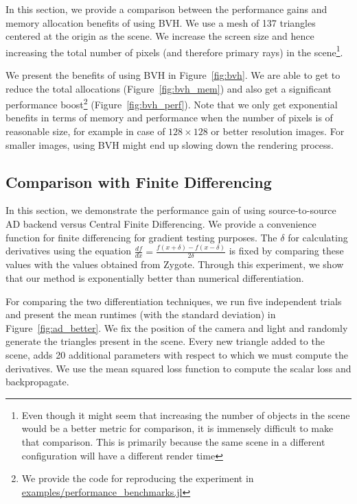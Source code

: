 \documentclass{juliacon}
\begin{document}
In this section, we provide a comparison between the performance gains and memory allocation benefits of using BVH. We use a mesh of 137 triangles centered at the origin as the scene. We increase the screen size and hence increasing the total number of pixels (and therefore primary rays) in the scene\footnote{Even though it might seem that increasing the number of objects in the scene would be a better metric for comparison, it is immensely difficult to make that comparison. This is primarily because the same scene in a different configuration will have a different render time}.

We present the benefits of using BVH in Figure~\ref{fig:bvh}. We are able to get to reduce the total allocations (Figure~\ref{fig:bvh_mem}) and also get a significant performance boost\footnote{\raggedright{We provide the code for reproducing the experiment in \href{https://zenodo.org/record/1442781}{examples/performance\_benchmarks.jl}}} (Figure~\ref{fig:bvh_perf}). Note that we only get exponential benefits in terms of memory and performance when the number of pixels is of reasonable size, for example in case of $128 \times 128$ or better resolution images. For smaller images, using BVH might end up slowing down the rendering process.

\subsection{Comparison with Finite Differencing}
\label{sec:finite_diff}

In this section, we demonstrate the performance gain of using source-to-source AD backend versus Central Finite Differencing. We provide a convenience function for finite differencing for gradient testing purposes. The $\delta$ for calculating derivatives using the equation $\frac{df}{dx} = \frac{f(x + \delta) - f(x - \delta)}{2\delta}$ is fixed by comparing these values with the values obtained from Zygote. Through this experiment, we show that our method is exponentially better than numerical differentiation.

For comparing the two differentiation techniques, we run five independent trials and present the mean runtimes (with the standard deviation) in Figure~\ref{fig:ad_better}. We fix the position of the camera and light and randomly generate the triangles present in the scene. Every new triangle added to the scene, adds 20 additional parameters with respect to which we must compute the derivatives. We use the mean squared loss function to compute the scalar loss and backpropagate.
\end{document}
